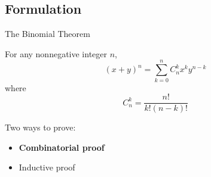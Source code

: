 \documentclass{beamer}
\begin{document}
\subsection{Formulation}
\begin{frame}{The Binomial Theorem}
    \begin{theorem}
    For any nonnegative integer $n$,
    \begin{displaymath}
    (x+y)^n=\sum_{k=0}^nC_n^k
    x^ky^{n-k}
    \end{displaymath}
    where 
    $$C_n^k=\frac{n!}{k!(n-k)!} $$
    \end{theorem}
    \vskip 0.5cm
    Two ways to prove:
    \begin{itemize}
    \item \textbf{Combinatorial proof}
    \item Inductive proof
    \end{itemize}
\end{frame}
\end{document}
